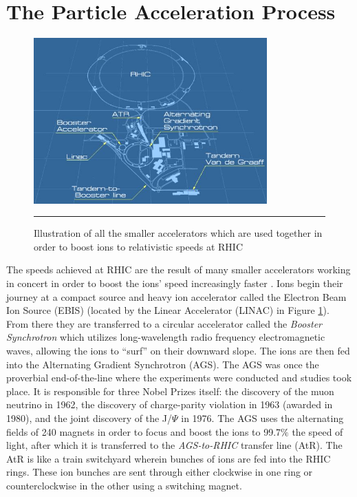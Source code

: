 \section{The Particle Acceleration Process}
\begin{figure}[htbp]
  \centering
    \includegraphics[width=0.8\textwidth]{Figures/RHICdiagram.JPG}
    \rule{35em}{0.5pt}
  \caption[Illustration of all the accelerators used to boost ions to relativistic speeds at RHIC]{Illustration of all the smaller accelerators which are used together in order to boost ions to relativistic speeds at RHIC}
  \label{fig:RHICdiagram}
\end{figure}
The speeds achieved at RHIC are the result of many smaller accelerators working in concert in order to boost the ions' speed increasingly faster \citep{RHICaccel}.  Ions begin their journey at a compact source and heavy ion accelerator called the Electron Beam Ion Source (EBIS) (located by the Linear Accelerator (LINAC) in Figure \ref{fig:RHICdiagram}). From there they are transferred to a circular accelerator called the \textit{Booster Synchrotron} which utilizes long-wavelength radio frequency electromagnetic waves, allowing the ions to ``surf'' on their downward slope. The ions are then fed into the Alternating Gradient Synchrotron (AGS). The AGS was once the proverbial end-of-the-line where the experiments were conducted and studies took place. It is responsible for three Nobel Prizes itself: the discovery of the muon neutrino in 1962, the discovery of charge-parity violation in 1963 (awarded in 1980), and the joint discovery of the J/$\Psi$ in 1976. The AGS uses the alternating fields of 240 magnets in order to focus and boost the ions to 99.7$\%$ the speed of light, after which it is transferred to the \textit{AGS-to-RHIC} transfer line (AtR). The AtR is like a train switchyard wherein bunches of ions are fed into the RHIC rings. These ion bunches are sent through either clockwise in one ring or counterclockwise in the other using a switching magnet.

